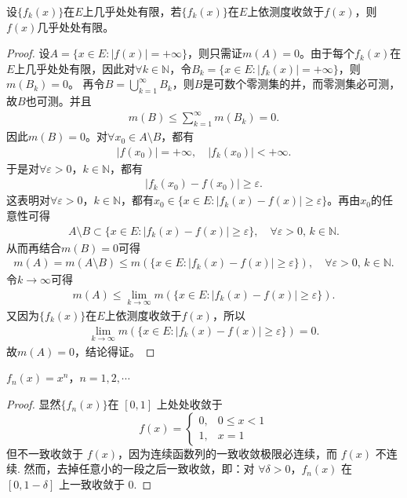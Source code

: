 \documentclass[../../main.tex]{subfiles}
\begin{document}
\begin{theorem}\label{theorem:依测度收敛的极限函数必几乎处处有限}
设\(\{f_k(x)\}\)在\(E\)上几乎处处有限，若\(\{f_k(x)\}\)在\(E\)上依测度收敛于\(f(x)\)，则\(f(x)\)几乎处处有限。
\end{theorem}
\begin{proof}
设\(A = \{x \in E : |f(x)| = +\infty\}\)，则只需证\(m(A) = 0\)。由于每个\(f_k(x)\)在\(E\)上几乎处处有限，因此对\(\forall k \in \mathbb{N}\)，令\(B_k = \{x \in E : |f_k(x)| = +\infty\}\)，则\(m(B_k) = 0\)。
再令\(B = \bigcup_{k=1}^{\infty} B_k\)，则\(B\)是可数个零测集的并，而零测集必可测，故\(B\)也可测。并且
\begin{align*}
m(B) \leqslant \sum_{k=1}^{\infty} m(B_k) = 0.
\end{align*}
因此\(m(B) = 0\)。对\(\forall x_0 \in A \setminus B\)，都有
\begin{align*}
|f(x_0)| = +\infty, \quad |f_k(x_0)| < +\infty.
\end{align*}
于是对\(\forall \varepsilon > 0\)，\(k \in \mathbb{N}\)，都有
\begin{align*}
|f_k(x_0) - f(x_0)| \geqslant \varepsilon.
\end{align*}
这表明对\(\forall \varepsilon > 0\)，\(k \in \mathbb{N}\)，都有\(x_0 \in \{x \in E : |f_k(x) - f(x)| \geqslant \varepsilon\}\)。再由\(x_0\)的任意性可得
\begin{align*}
A \setminus B \subset \{x \in E : |f_k(x) - f(x)| \geqslant \varepsilon\}, \quad \forall \varepsilon > 0, \, k \in \mathbb{N}.
\end{align*}
从而再结合\(m(B) = 0\)可得
\begin{align*}
m(A) = m(A \setminus B) \leqslant m(\{x \in E : |f_k(x) - f(x)| \geqslant \varepsilon\}), \quad \forall \varepsilon > 0, \, k \in \mathbb{N}.
\end{align*}
令\(k \to \infty\)可得
\begin{align*}
m(A) \leqslant \lim_{k \to \infty} m(\{x \in E : |f_k(x) - f(x)| \geqslant \varepsilon\}).
\end{align*}
又因为\(\{f_k(x)\}\)在\(E\)上依测度收敛于\(f(x)\)，所以
\begin{align*}
\lim_{k \to \infty} m(\{x \in E : |f_k(x) - f(x)| \geqslant \varepsilon\}) = 0.
\end{align*}
故\(m(A) = 0\)，结论得证。
\end{proof}

\begin{example}[收敛但不一致收敛的函数]

$f_n(x)=x^n$，$n = 1,2,\cdots$ 
\end{example}
\begin{proof}
显然$\{f_n(x)\}$在 $[0,1]$ 上处处收敛于
\[
f(x)=
\begin{cases}
0, & 0\leqslant x<1 \\
1, & x = 1
\end{cases}
\]
但不一致收敛于 $f(x)$，因为连续函数列的一致收敛极限必连续，而 $f(x)$ 不连续. 然而，去掉任意小的一段之后一致收敛，即：对 $\forall\delta>0$，$f_n(x)$ 在 $[0,1 - \delta]$ 上一致收敛于 $0$.
\end{proof}
\end{document}
